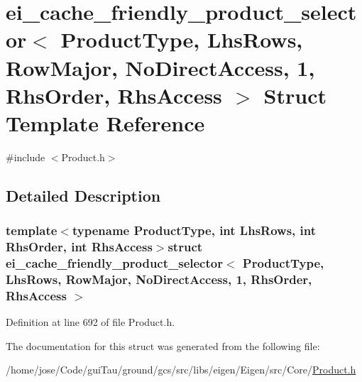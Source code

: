 \hypertarget{structei__cache__friendly__product__selector_3_01_product_type_00_01_lhs_rows_00_01_row_major_001017c5de7475ac6e93b224b77f982b9c}{\section{ei\-\_\-cache\-\_\-friendly\-\_\-product\-\_\-selector$<$ Product\-Type, Lhs\-Rows, Row\-Major, No\-Direct\-Access, 1, Rhs\-Order, Rhs\-Access $>$ Struct Template Reference}
\label{structei__cache__friendly__product__selector_3_01_product_type_00_01_lhs_rows_00_01_row_major_001017c5de7475ac6e93b224b77f982b9c}
}


{\ttfamily \#include $<$Product.\-h$>$}



\subsection{Detailed Description}
\subsubsection*{template$<$typename Product\-Type, int Lhs\-Rows, int Rhs\-Order, int Rhs\-Access$>$struct ei\-\_\-cache\-\_\-friendly\-\_\-product\-\_\-selector$<$ Product\-Type, Lhs\-Rows, Row\-Major, No\-Direct\-Access, 1, Rhs\-Order, Rhs\-Access $>$}



Definition at line 692 of file Product.\-h.



The documentation for this struct was generated from the following file\-:\begin{DoxyCompactItemize}
\item 
/home/jose/\-Code/gui\-Tau/ground/gcs/src/libs/eigen/\-Eigen/src/\-Core/\hyperlink{_product_8h}{Product.\-h}\end{DoxyCompactItemize}
